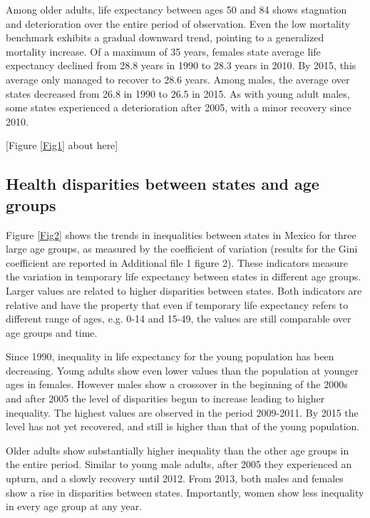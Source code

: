 \documentclass{bmcart}
\begin{document}
Among older adults, life expectancy between ages 50 and 84 shows stagnation and deterioration over the entire period of observation. Even the low mortality benchmark exhibits a gradual downward trend, pointing to a generalized mortality increase. Of a maximum of 35 years, females state average life expectancy declined from 28.8 years in 1990 to 28.3 years in 2010. By 2015, this average only managed to recover to 28.6 years. Among males, the average over states decreased from 26.8 in 1990 to 26.5 in 2015. As with young adult males, some states experienced a deterioration after 2005, with a minor recovery since 2010.\\

\begin{center}
[Figure \ref{Fig1} about here]
\end{center}

\subsection*{Health disparities between states and age groups}
Figure \ref{Fig2} shows the trends in inequalities between states in Mexico for three large age groups, as measured by the coefficient of variation (results for the Gini coefficient are reported in Additional file 1 figure 2). These indicators measure the variation in temporary life expectancy between states in different age groups. Larger values are related to higher disparities between states. Both indicators are relative and have the property that even if temporary life expectancy refers to different range of ages, e.g. 0-14 and 15-49, the values are still comparable over age groups and time. 

Since 1990, inequality in life expectancy for the young population has been decreasing. Young adults show even lower values than the population at younger ages in females. However males show a crossover in the beginning of the 2000s and after 2005 the level of disparities begun to increase leading to higher inequality. The highest values are observed in the period 2009-2011. By 2015 the level has not yet recovered, and still is higher than that of the young population.

Older adults show substantially higher inequality than the other age groups in the entire period. Similar to young male adults, after 2005 they experienced an upturn, and a slowly recovery until 2012. From 2013, both males and females show a rise in disparities between states. Importantly, women show less inequality in every age group at any year. 
\end{document}
